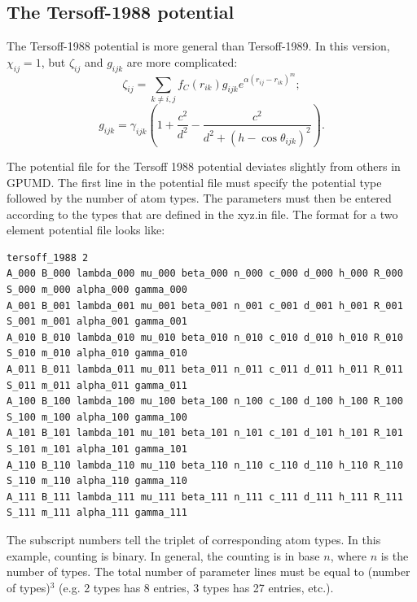 \documentclass[12pt,a4paper]{report}
\begin{document}
\subsection{The Tersoff-1988 potential}

The Tersoff-1988 potential is more general than Tersoff-1989. In this version, $\chi_{ij}=1$, but $\zeta_{ij}$ and $g_{ijk}$ are more complicated:
\begin{equation}
\zeta_{ij} = \sum_{k\neq i, j}f_C(r_{ik}) g_{ijk} e^{\alpha(r_{ij} - r_{ik})^{m}};
\end{equation}
\begin{equation}
g_{ijk} = \gamma_{ijk}\left( 1 + \frac{c^2}{d^2} - \frac{c^2}{d^2+(h-\cos\theta_{ijk})^2} \right).
\end{equation}

The potential file for the Tersoff 1988 potential deviates slightly from others in GPUMD. The first line in the potential file must specify the potential type followed by the number of atom types. The parameters must then be entered according to the types that are defined in the xyz.in file. The format for a two element potential file looks like:
\begin{tiny}
\begin{verbatim}
tersoff_1988 2
A_000 B_000 lambda_000 mu_000 beta_000 n_000 c_000 d_000 h_000 R_000 S_000 m_000 alpha_000 gamma_000
A_001 B_001 lambda_001 mu_001 beta_001 n_001 c_001 d_001 h_001 R_001 S_001 m_001 alpha_001 gamma_001
A_010 B_010 lambda_010 mu_010 beta_010 n_010 c_010 d_010 h_010 R_010 S_010 m_010 alpha_010 gamma_010
A_011 B_011 lambda_011 mu_011 beta_011 n_011 c_011 d_011 h_011 R_011 S_011 m_011 alpha_011 gamma_011
A_100 B_100 lambda_100 mu_100 beta_100 n_100 c_100 d_100 h_100 R_100 S_100 m_100 alpha_100 gamma_100
A_101 B_101 lambda_101 mu_101 beta_101 n_101 c_101 d_101 h_101 R_101 S_101 m_101 alpha_101 gamma_101
A_110 B_110 lambda_110 mu_110 beta_110 n_110 c_110 d_110 h_110 R_110 S_110 m_110 alpha_110 gamma_110
A_111 B_111 lambda_111 mu_111 beta_111 n_111 c_111 d_111 h_111 R_111 S_111 m_111 alpha_111 gamma_111
\end{verbatim}
\end{tiny}

The subscript numbers tell the triplet of corresponding atom types. In this example, counting is binary. In general, the counting is in base $n$, where $n$ is the number of types. The total number of parameter lines must be equal to (number of types)$^{3}$ (e.g. 2 types has 8 entries, 3 types has 27 entries, etc.).
\end{document}
